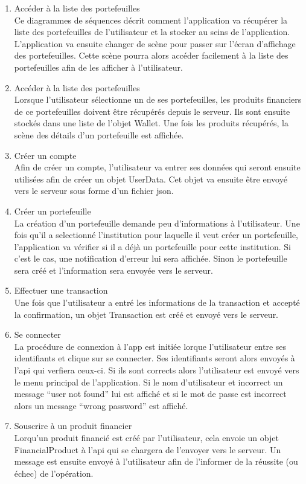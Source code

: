 \documentclass[../rapport.tex]{subfiles}
\begin{document}
\begin{enumerate}
	\item{Accéder à la liste des portefeuilles}\\
Ce diagrammes de séquences décrit comment l'application va récupérer la liste des portefeuilles de l'utilisateur et la stocker au seins de l'application.
L'application va ensuite changer de scène pour passer sur l'écran d'affichage des portefeuilles. Cette scène pourra alors accéder facilement à la liste des portefeuilles afin de les afficher à l'utilisateur.
	\item{Accéder à la liste des portefeuilles}\\
Lorsque l'utilisateur sélectionne un de ses portefeuilles, les produits financiers de ce portefeuilles doivent être récupérés depuis le serveur. Ils sont ensuite stockés dans une liste de l'objet Wallet. Une fois les produits récupérés, la scène des détails d'un portefeuille est affichée.
	\item{Créer un compte}\\
Afin de créer un compte, l'utilisateur va entrer ses données qui seront ensuite utilisées afin de créer un objet UserData. Cet objet va ensuite être envoyé vers le serveur sous forme d'un fichier json.
	\item{Créer un portefeuille}\\
La création d'un portefeuille demande peu d'informations à l'utilisateur. Une fois qu'il a selectionné l'institution pour laquelle il veut créer un portefeuille, l'application va vérifier si il a déjà un portefeuille pour cette institution. Si c'est le cas, une notification d'erreur lui sera affichée. Sinon le portefeuille sera créé et l'information sera envoyée vers le serveur.
	\item{Effectuer une transaction}\\
Une fois que l'utilisateur a entré les informations de la transaction et accepté la confirmation, un objet Transaction est créé et envoyé vers le serveur.
	\item{Se connecter}\\
La procédure de connexion à l'app est initiée lorque l'utilisateur entre ses identifiants et clique sur se connecter. Ses identifiants seront alors envoyés à l'api qui verfiera ceux-ci. Si ils sont corrects alors l'utilisateur est envoyé vers le menu principal de l'application. Si le nom d'utilisateur et incorrect un message ``user not found'' lui est affiché et si le mot de passe est incorrect alors un message ``wrong password'' est affiché.
	\item{Souscrire à un produit financier}\\
Lorqu'un produit financié est créé par l'utilisateur, cela envoie un objet FinancialProduct à l'api qui se chargera de l'envoyer vers le serveur.
Un message est ensuite envoyé à l'utilisateur afin de l'informer de la réussite (ou échec) de l'opération.
\end{enumerate}
\end{document}
